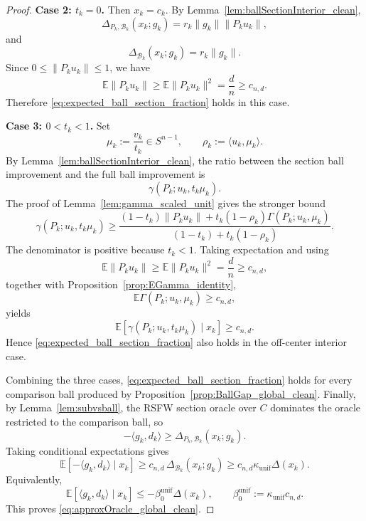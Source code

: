 \documentclass{article}
\begin{document}
\begin{proof}
\smallskip
\noindent\textbf{Case 2: \(t_k=0\).}
Then \(x_k=c_k\). By Lemma~\ref{lem:ballSectionInterior_clean},
\[
\Delta_{P_k,\mathcal B_k}(x_k;g_k)
=
r_k\|g_k\|\|P_ku_k\|,
\]
and
\[
\Delta_{\mathcal B_k}(x_k;g_k)
=
r_k\|g_k\|.
\]
Since \(0\le \|P_ku_k\|\le1\), we have
\[
\mathbb E\|P_ku_k\|
\ge
\mathbb E\|P_ku_k\|^2
=
\frac dn
\ge
c_{n,d}.
\]
Therefore \eqref{eq:expected_ball_section_fraction} holds in this case.

\smallskip
\noindent\textbf{Case 3: \(0<t_k<1\).}
Set
\[
\mu_k:=\frac{v_k}{t_k}\in S^{n-1},
\qquad
\rho_k:=\langle u_k,\mu_k\rangle.
\]
By Lemma~\ref{lem:ballSectionInterior_clean}, the ratio between the section
ball improvement and the full ball improvement is
\[
\gamma(P_k;u_k,t_k\mu_k).
\]
The proof of Lemma~\ref{lem:gamma_scaled_unit} gives the stronger bound
\[
\gamma(P_k;u_k,t_k\mu_k)
\ge
\frac{(1-t_k)\|P_ku_k\|
+t_k(1-\rho_k)\Gamma(P_k;u_k,\mu_k)}
{(1-t_k)+t_k(1-\rho_k)}.
\]
The denominator is positive because \(t_k<1\). Taking expectation and using
\[
\mathbb E\|P_ku_k\|
\ge
\mathbb E\|P_ku_k\|^2
=
\frac dn
\ge
c_{n,d},
\]
together with Proposition~\ref{prop:EGamma_identity},
\[
\mathbb E\Gamma(P_k;u_k,\mu_k)\ge c_{n,d},
\]
yields
\[
\mathbb E[
\gamma(P_k;u_k,t_k\mu_k)
\mid x_k]
\ge
c_{n,d}.
\]
Hence \eqref{eq:expected_ball_section_fraction} also holds in the off-center
interior case.

Combining the three cases, \eqref{eq:expected_ball_section_fraction} holds for
every comparison ball produced by Proposition~\ref{prop:BallGap_global_clean}.
Finally, by Lemma~\ref{lem:subvsball}, the RSFW section oracle over \(C\)
dominates the oracle restricted to the comparison ball, so
\[
-\langle g_k,d_k\rangle
\ge
\Delta_{P_k,\mathcal B_k}(x_k;g_k).
\]
Taking conditional expectations gives
\[
\mathbb E[-\langle g_k,d_k\rangle\mid x_k]
\ge
c_{n,d}\,\Delta_{\mathcal B_k}(x_k;g_k)
\ge
c_{n,d}\kappa_{\mathrm{unif}}\Delta(x_k).
\]
Equivalently,
\[
\mathbb E[\langle g_k,d_k\rangle\mid x_k]
\le
-\beta_0^{\mathrm{unif}}\Delta(x_k),
\qquad
\beta_0^{\mathrm{unif}}:=\kappa_{\mathrm{unif}}c_{n,d}.
\]
This proves \eqref{eq:approxOracle_global_clean}.
\end{proof}
\end{document}
